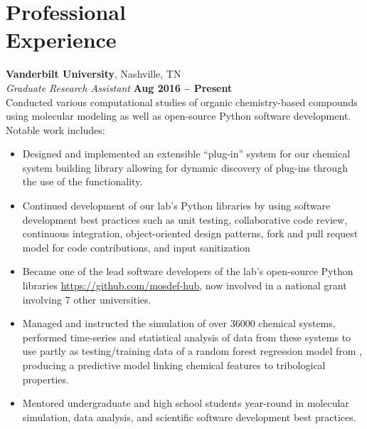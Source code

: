 \section{\mysidestyle Professional\\Experience}

\textbf{Vanderbilt University}, Nashville, TN \vspace{2mm}\\\vspace{1mm}%
\textsl{Graduate Research Assistant} \hfill \textbf{Aug 2016 -- Present}\\
Conducted various computational studies of organic chemistry-based compounds using molecular modeling as well as open-source Python software development. Notable work includes:

\begin{itemize}[itemsep=0.5mm, parsep=2pt]
\item Designed and implemented an extensible ``plug-in'' system for our chemical system building library  allowing for dynamic discovery of plug-ins through the use of the   functionality.
\item Continued development of our lab's Python libraries by using software development best practices such as unit testing, collaborative code review, continuous integration, object-oriented design patterns, fork and pull request model for code contributions, and input sanitization 
\item Became one of the lead software developers of the lab's open-source Python libraries \url{https://github.com/mosdef-hub}, now involved in a national grant involving 7 other universities.
\item Managed and instructed the simulation of over \num{36000} chemical systems, performed time-series and statistical analysis of data from these systems to use partly as testing/training data of a random forest regression model from , producing a predictive model linking chemical features to tribological properties.
\item Mentored undergraduate and high school students year-round in molecular simulation, data analysis, and scientific software development best practices.
\end{itemize}


